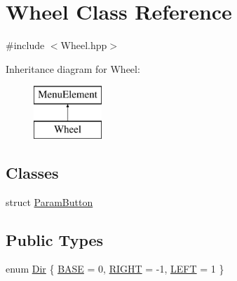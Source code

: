\hypertarget{class_wheel}{}\section{Wheel Class Reference}
\label{class_wheel}


{\ttfamily \#include $<$Wheel.\+hpp$>$}

Inheritance diagram for Wheel\+:\begin{figure}[H]
\begin{center}
\leavevmode
\includegraphics[height=2.000000cm]{class_wheel}
\end{center}
\end{figure}
\subsection*{Classes}
\begin{DoxyCompactItemize}
\item 
struct \mbox{\hyperlink{struct_wheel_1_1_param_button}{Param\+Button}}
\end{DoxyCompactItemize}
\subsection*{Public Types}
\begin{DoxyCompactItemize}
\item 
enum \mbox{\hyperlink{class_wheel_ae7bd200dca893d41c3177b4c356dad6e}{Dir}} \{ \mbox{\hyperlink{class_wheel_ae7bd200dca893d41c3177b4c356dad6ead153018ab6d3b3727419d2b19413f170}{B\+A\+SE}} = 0, 
\mbox{\hyperlink{class_wheel_ae7bd200dca893d41c3177b4c356dad6ea2449384218f36dce1f1936035443c003}{R\+I\+G\+HT}} = -\/1, 
\mbox{\hyperlink{class_wheel_ae7bd200dca893d41c3177b4c356dad6ea2991cb740ecf8791a54cb65a52595954}{L\+E\+FT}} = 1
 \}
\end{DoxyCompactItemize}
